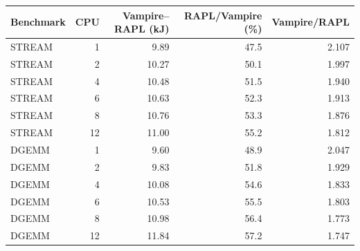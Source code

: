 \begin{tabular}{lrrrr}
\hline
Benchmark & CPU & Vampire--RAPL (kJ) & RAPL/Vampire (\%) & Vampire/RAPL \\
\hline
STREAM & 1 & 9.89 & 47.5 & 2.107 \\
STREAM & 2 & 10.27 & 50.1 & 1.997 \\
STREAM & 4 & 10.48 & 51.5 & 1.940 \\
STREAM & 6 & 10.63 & 52.3 & 1.913 \\
STREAM & 8 & 10.76 & 53.3 & 1.876 \\
STREAM & 12 & 11.00 & 55.2 & 1.812 \\
DGEMM & 1 & 9.60 & 48.9 & 2.047 \\
DGEMM & 2 & 9.83 & 51.8 & 1.929 \\
DGEMM & 4 & 10.08 & 54.6 & 1.833 \\
DGEMM & 6 & 10.53 & 55.5 & 1.803 \\
DGEMM & 8 & 10.98 & 56.4 & 1.773 \\
DGEMM & 12 & 11.84 & 57.2 & 1.747 \\
\hline
\end{tabular}
